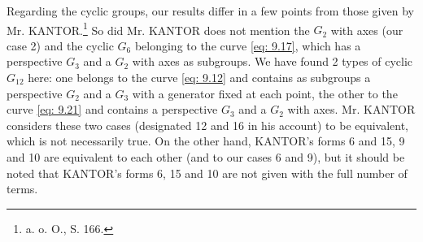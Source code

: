 \documentclass[leqno]{article}
\begin{document}
Regarding the cyclic groups, our results differ in a few points from those given by Mr. KANTOR.\footnote{a. o. O., S. 166.} So did Mr. KANTOR does not mention the $G_2$ \guillemotright with axes\guillemotright{} (our case 2) and the cyclic $G_6$ belonging to the curve \eqref{eq: 9.17}, which has a perspective $G_3$ and a $G_2$ \guillemotright with axes\guillemotright{} as subgroups. We have found 2 types of cyclic $G_{12}$ here: one belongs to the curve \eqref{eq: 9.12} and contains as subgroups a perspective $G_2$ and a $G_3$ with a generator fixed at each point, the other to the curve \eqref{eq: 9.21} and contains a perspective $G_3$ and a $G_2$ \guillemotright with axes\guillemotright. Mr. KANTOR considers these two cases (designated 12 and 16 in his account) to be equivalent, which is not necessarily true. On the other hand, KANTOR's forms 6 and 15, 9 and 10 are equivalent to each other (and to our cases 6 and 9), but it should be noted that KANTOR's forms 6, 15 and 10 are not given with the full number of terms. 
\end{document}
